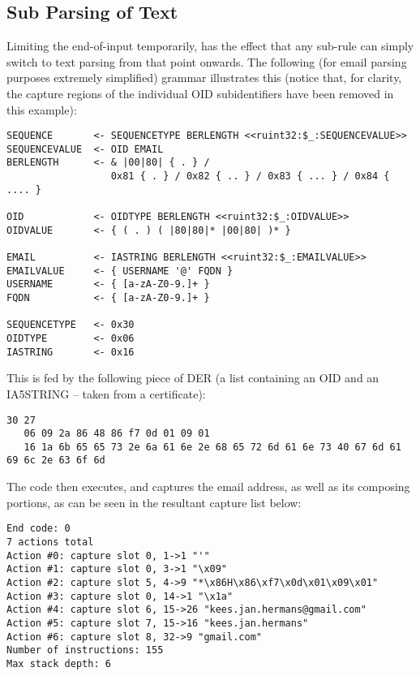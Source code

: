 \subsection{Sub Parsing of Text}

Limiting the end-of-input temporarily, has the effect that any sub-rule 
can simply switch to text parsing from that point onwards. The following 
(for email parsing purposes extremely simplified) grammar illustrates this
(notice that, for clarity, the capture regions of the individual OID
subidentifiers have been removed in this example):

\begin{changemargin}{-60mm}{0mm}
\begin{myquote}
\begin{verbatim}
SEQUENCE       <- SEQUENCETYPE BERLENGTH <<ruint32:$_:SEQUENCEVALUE>>
SEQUENCEVALUE  <- OID EMAIL
BERLENGTH      <- & |00|80| { . } /
                  0x81 { . } / 0x82 { .. } / 0x83 { ... } / 0x84 { .... }

OID            <- OIDTYPE BERLENGTH <<ruint32:$_:OIDVALUE>>
OIDVALUE       <- { ( . ) ( |80|80|* |00|80| )* }

EMAIL          <- IASTRING BERLENGTH <<ruint32:$_:EMAILVALUE>>
EMAILVALUE     <- { USERNAME '@' FQDN }
USERNAME       <- { [a-zA-Z0-9.]+ }
FQDN           <- { [a-zA-Z0-9.]+ }

SEQUENCETYPE   <- 0x30
OIDTYPE        <- 0x06
IASTRING       <- 0x16
\end{verbatim}
\end{myquote}
\end{changemargin}

This is fed by the following piece of DER (a list containing an OID and an 
IA5STRING – taken from a certificate):

\begin{changemargin}{-60mm}{0mm}
\begin{myquote}
\begin{verbatim}
30 27
   06 09 2a 86 48 86 f7 0d 01 09 01
   16 1a 6b 65 65 73 2e 6a 61 6e 2e 68 65 72 6d 61 6e 73 40 67 6d 61 69 6c 2e 63 6f 6d
\end{verbatim}
\end{myquote}
\end{changemargin}

The code then executes, and captures the email address, as well as its 
composing portions, as can be seen in the resultant capture list below:

\begin{changemargin}{-60mm}{0mm}
\begin{myquote}
\begin{verbatim}
End code: 0
7 actions total
Action #0: capture slot 0, 1->1 "'"
Action #1: capture slot 0, 3->1 "\x09"
Action #2: capture slot 5, 4->9 "*\x86H\x86\xf7\x0d\x01\x09\x01"
Action #3: capture slot 0, 14->1 "\x1a"
Action #4: capture slot 6, 15->26 "kees.jan.hermans@gmail.com"
Action #5: capture slot 7, 15->16 "kees.jan.hermans"
Action #6: capture slot 8, 32->9 "gmail.com"
Number of instructions: 155
Max stack depth: 6
\end{verbatim}
\end{myquote}
\end{changemargin}

